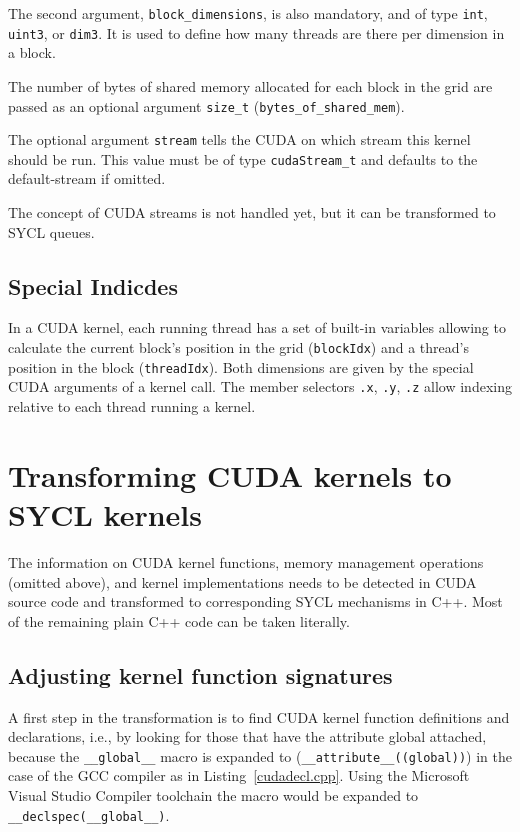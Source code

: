 \documentclass[sigconf]{acmart}
\newcommand{\inputcode}[2]{}
\newcommand{\tcode}[1]{\texttt{#1}}
\newcommand{\intt}[1]{\texttt{#1}}
\begin{document}
    The second argument, \intt{block_dimensions}, is also mandatory, and of type \intt{int}, \intt{uint3}, or \intt{dim3}. It is used to define how many threads are there per dimension in a block. %
    
    The number of bytes of shared memory allocated for each block in the grid are passed as an optional argument \intt{size_t} (\intt{bytes_of_shared_mem}). 
    
    The optional argument \intt{stream} tells the CUDA on which stream this kernel should be run. This value must be of type \intt{cudaStream_t} and defaults to the default-stream if omitted.

    The concept of CUDA streams is not handled yet, but it can be transformed to SYCL queues.


\subsection{Special Indicdes}
In a CUDA kernel, each running thread has a set of built-in variables allowing to calculate the current block's position in the grid (\tcode{blockIdx}) and a thread's position in the block (\tcode{threadIdx}). Both dimensions are given by the special CUDA arguments of a kernel call. The member selectors \tcode{.x}, \tcode{.y}, \tcode{.z} allow indexing relative to each thread running a kernel.

\section{Transforming CUDA kernels to SYCL kernels}
The information on CUDA kernel functions, memory management operations (omitted above), and kernel implementations needs to be detected in CUDA source code and transformed to corresponding SYCL mechanisms in C++. Most of the remaining plain C++ code can be taken literally.
 
\subsection{Adjusting kernel function signatures}
A first step in the transformation is to find CUDA kernel function definitions and declarations, i.e., by looking for those that have the attribute global attached, because the \tcode{__global__} macro is expanded to (\tcode{__attribute__((global))}) in the case of the GCC compiler as in Listing~\ref{cudadecl.cpp}. Using the Microsoft Visual Studio Compiler toolchain the macro would be expanded to \tcode{__declspec(__global__)}.
\inputcode{cudadecl.cpp}{Declaring a CUDA kernel}
\end{document}
